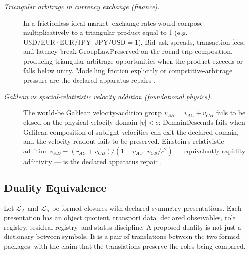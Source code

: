 \documentclass[11pt]{article}
\theoremstyle{definition}
\begin{document}
\begin{description}
\item[\emph{Triangular arbitrage in currency exchange (finance).}]
In a frictionless ideal market, exchange rates would compose
multiplicatively to a triangular product equal to 1
(e.g.\ \(\mathrm{USD/EUR}\cdot\mathrm{EUR/JPY}\cdot
\mathrm{JPY/USD}=1\)).  Bid--ask spreads, transaction fees, and
latency break GroupLawPreserved on the round-trip composition,
producing triangular-arbitrage opportunities when the product
exceeds or falls below unity.  Modelling friction explicitly or
competitive-arbitrage pressure are the declared apparatus repairs
\citep{Aliber1973InterestRateParity}.

\item[\emph{Galilean vs special-relativistic velocity addition
(foundational physics).}]
The would-be Galilean velocity-addition group \(v_{AB}=v_{AC}+v_{CB}\)
fails to be closed on the physical velocity domain \(|v|<c\):
DomainDescends fails when Galilean composition of sublight
velocities can exit the declared domain, and the velocity readout
fails to be preserved.  Einstein's relativistic addition
\(v_{AB}=(v_{AC}+v_{CB})/(1+v_{AC}\cdot v_{CB}/c^2)\) --- equivalently
rapidity additivity --- is the declared apparatus repair
\citep{Einstein1905Elektrodynamik}.
\end{description}

\subsection{Duality Equivalence}\label{sec:symmetry:duality-equivalence}

Let \(\mathcal L_A\) and \(\mathcal L_B\) be formed closures with
declared symmetry presentations.  Each presentation has an object
quotient, transport data, declared observables, role registry,
residual registry, and status discipline.  A proposed duality is not
just a dictionary between symbols.  It is a pair of translations
between the two formed packages, with the claim that the translations
preserve the roles being compared.
\end{document}
